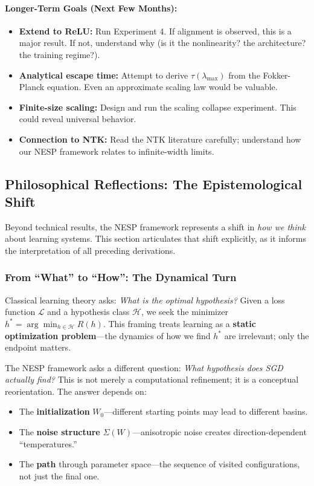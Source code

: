 \documentclass[
  journal=largetwo,
  year=2025,
  volume=37,
]{cup-journal}
\begin{document}
\paragraph{Longer-Term Goals (Next Few Months):}
\begin{itemize}
    \item \textbf{Extend to ReLU:} Run Experiment 4. If alignment is observed, this is a major result. If not, understand why (is it the nonlinearity? the architecture? the training regime?).
    \item \textbf{Analytical escape time:} Attempt to derive $\tau(\lambda_{\max})$ from the Fokker-Planck equation. Even an approximate scaling law would be valuable.
    \item \textbf{Finite-size scaling:} Design and run the scaling collapse experiment. This could reveal universal behavior.
    \item \textbf{Connection to NTK:} Read the NTK literature carefully; understand how our NESP framework relates to infinite-width limits.
\end{itemize}

\subsection{Philosophical Reflections: The Epistemological Shift}\label{app:philosophy}

Beyond technical results, the NESP framework represents a shift in \textit{how we think} about learning systems. This section articulates that shift explicitly, as it informs the interpretation of all preceding derivations.

\subsubsection{From ``What'' to ``How'': The Dynamical Turn}

Classical learning theory asks: \textit{What is the optimal hypothesis?} Given a loss function $\mathcal{L}$ and a hypothesis class $\mathcal{H}$, we seek the minimizer $h^* = \arg\min_{h \in \mathcal{H}} R(h)$. This framing treats learning as a \textbf{static optimization problem}---the dynamics of how we find $h^*$ are irrelevant; only the endpoint matters.

The NESP framework asks a different question: \textit{What hypothesis does SGD actually find?} This is not merely a computational refinement; it is a conceptual reorientation. The answer depends on:
\begin{itemize}
    \item The \textbf{initialization} $W_0$---different starting points may lead to different basins.
    \item The \textbf{noise structure} $\Sigma(W)$---anisotropic noise creates direction-dependent ``temperatures.''
    \item The \textbf{path} through parameter space---the sequence of visited configurations, not just the final one.
\end{itemize}
\end{document}
